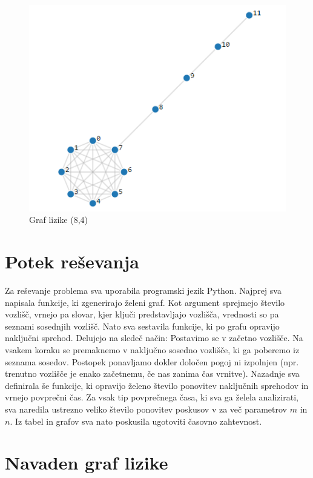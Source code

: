 \documentclass[12pt,a4paper]{amsart}
\begin{document}
\begin{figure}[h]
    \includegraphics[width=\textwidth]{Lollipop_graph.png}
    \caption{Graf lizike (8,4)}
\end{figure}

\section{Potek reševanja}
Za reševanje problema sva uporabila programski jezik Python. Najprej sva napisala funkcije, ki zgenerirajo želeni graf.
Kot argument sprejmejo število vozlišč, vrnejo pa slovar, kjer ključi predstavljajo vozlišča, vrednosti so pa seznami
sosednjih vozlišč. Nato sva sestavila funkcije, ki po grafu opravijo naključni sprehod. Delujejo na sledeč način: 
Postavimo se v začetno vozlišče. Na vsakem koraku se premaknemo v naključno sosedno vozlišče, ki ga poberemo iz
seznama sosedov. Postopek ponavljamo dokler določen pogoj ni izpolnjen (npr. trenutno vozlišče je enako začetnemu,
če nas zanima čas vrnitve). Nazadnje sva definirala še funkcije, ki opravijo želeno število ponovitev naključnih sprehodov
in vrnejo povprečni čas.
Za vsak tip povprečnega časa, ki sva ga želela analizirati, sva naredila ustrezno veliko število ponovitev poskusov v
za več parametrov $m$ in $n$. Iz tabel in grafov sva nato poskusila ugotoviti časovno zahtevnost.

\section{Navaden graf lizike}
\end{document}
